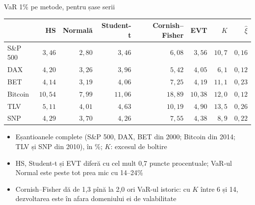 \begin{frame}{VaR 1\% pe metode, pentru șase serii}
\itemsize{\footnotesize}
\begin{center}
\footnotesize
\begin{tabular}{lrrrrrrr}
\toprule
& HS & Normală & Student-t & Cornish--Fisher & EVT & $K$ & $\hat\xi$ \\
\midrule
S\&P 500 & $3{,}46$ & $2{,}80$ & $3{,}46$ & $6{,}08$ & $3{,}56$ & ${10{,}7}$ & $0{,}16$ \\
DAX & $4{,}20$ & $3{,}26$ & $3{,}96$ & $5{,}42$ & $4{,}05$ & ${6{,}1}$ & $0{,}12$ \\
BET & $4{,}14$ & $3{,}19$ & $4{,}06$ & $7{,}25$ & $4{,}19$ & ${11{,}1}$ & $0{,}23$ \\
Bitcoin & $10{,}54$ & $7{,}99$ & $11{,}06$ & $18{,}89$ & $10{,}38$ & ${12{,}0}$ & $0{,}12$ \\
TLV & $5{,}11$ & $4{,}01$ & $4{,}63$ & $10{,}19$ & $4{,}90$ & ${13{,}5}$ & $0{,}26$ \\
SNP & $4{,}29$ & $3{,}70$ & $4{,}26$ & $7{,}55$ & $4{,}38$ & ${8{,}9}$ & $0{,}22$ \\
\bottomrule
\end{tabular}
\end{center}
\begin{itemize}
    \item Eșantioanele complete (S\&P 500, DAX, BET din 2000; Bitcoin din 2014; TLV și SNP din 2010), în \%; $K$: excesul de boltire
    \item HS, Student-t și EVT diferă cu cel mult 0{,}7 puncte procentuale; VaR-ul Normal este peste tot prea mic cu 14--24\%
    \item Cornish--Fisher dă de 1{,}3 pînă la 2{,}0 ori VaR-ul istoric: cu $K$ între 6 și 14, dezvoltarea este în afara domeniului ei de valabilitate
\end{itemize}
\end{frame}

